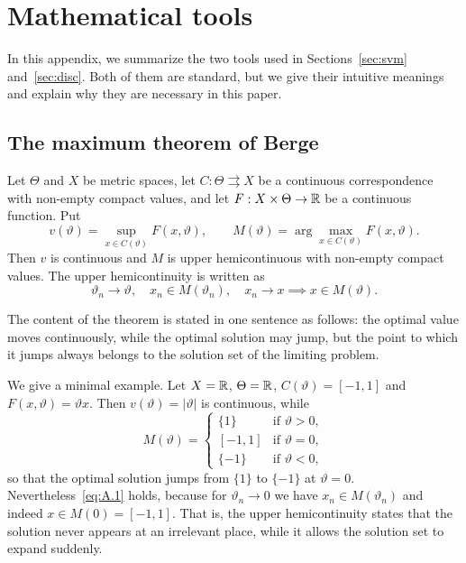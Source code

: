\section{Mathematical tools}
\label{app:A}

In this appendix, we summarize the two tools used in Sections~\ref{sec:svm}
and~\ref{sec:disc}. Both of them are standard, but we give their intuitive meanings
and explain why they are necessary in this paper.

\subsection{The maximum theorem of Berge}
\label{app:A.1}

\begin{theorem}[Berge, 1963]
\label{thm:A.1}
Let $\Theta$ and $X$ be metric spaces, let $C:\Theta\rightrightarrows X$ be a
continuous correspondence with non-empty compact values, and let
$F:X\times\Theta\to\mathbb{R}$ be a continuous function. Put
\[
v(\vartheta)=\sup_{x\in C(\vartheta)}F(x,\vartheta),\qquad
M(\vartheta)=\arg\max_{x\in C(\vartheta)}F(x,\vartheta).
\]
Then $v$ is continuous and $M$ is upper hemicontinuous with non-empty compact
values. The upper hemicontinuity is written as
\begin{equation}
\vartheta_n\to\vartheta,\quad x_n\in M(\vartheta_n),\quad x_n\to x
\implies x\in M(\vartheta).
\label{eq:A.1}
\end{equation}
\end{theorem}

The content of the theorem is stated in one sentence as follows: the optimal value
moves continuously, while the optimal solution may jump, but the point to which it
jumps always belongs to the solution set of the limiting problem.

We give a minimal example. Let $X=\mathbb{R}$, $\Theta=\mathbb{R}$, $C(\vartheta)=[-1,1]$ and
$F(x,\vartheta)=\vartheta x$. Then $v(\vartheta)=|\vartheta|$ is continuous, while
\[
M(\vartheta)=\begin{cases}
\{1\} & \text{if }\vartheta>0,\\
[-1,1] & \text{if }\vartheta=0,\\
\{-1\} & \text{if }\vartheta<0,
\end{cases}
\]
so that the optimal solution jumps from $\{1\}$ to $\{-1\}$ at $\vartheta=0$.
Nevertheless~\eqref{eq:A.1} holds, because for $\vartheta_n\to 0$ we have
$x_n\in M(\vartheta_n)$ and indeed $x\in M(0)=[-1,1]$. That is, the upper
hemicontinuity states that the solution never appears at an irrelevant place, while
it allows the solution set to expand suddenly.

